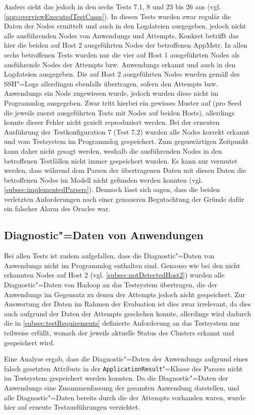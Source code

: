 Anders sieht das jedoch in den sechs \glspl{Test} 7.1, 8 und 23 bis 26 aus (vgl. \cref{app:overviewExecutedTestCases}).
In diesen \glspl{Test} wurden zwar regulär die Daten der Nodes ermittelt und auch in den Logdateien ausgegeben, jedoch nicht alle ausführenden Nodes von \glspl{Anwendung} und Attempts.
Konkret betrifft das hier die beiden auf Host 2 ausgeführten Nodes der betroffenen \gls{AppMstr}.
In allen sechs betroffenen \glspl{Test} wurden nur die vier auf Host 1 ausgeführten Nodes als ausführende Nodes der \glspl{Attempt} bzw. \glspl{Anwendung} erkannt und auch in den Logdateien ausgegeben.
Die auf Host 2 ausgeführten Nodes wurden gemäß des SSH"=Logs allerdingsn ebenfalls übertragen, sofern den \glspl{Attempt} bzw. \glspl{Anwendung} ein Node zugewiesen wurde, jedoch wurden diese nicht im Programmlog ausgegeben.
Zwar tritt hierbei ein gewisses Muster auf (pro Seed die jeweils zuerst ausgeführten \glspl{Test} mit Nodes auf beiden Hosts), allerdings konnte dieser Fehler nicht gezielt reproduziert werden.
Bei der erneuten Ausführung der \gls{Testkonfiguration} 7 (Test 7.2) wurden alle Nodes korrekt erkannt und vom Testsystem im Programmlog gespeichert.
Zum gegenwärtigen Zeitpunkt kann daher nicht gesagt werden, weshalb die ausführenden Nodes in den betroffenen Testfällen nicht immer gespeichert wurden.
Es kann nur vermutet werden, dass während dem Parsen der übertragenen Daten mit diesen Daten die betroffenen Nodes im Modell nicht gefunden werden konnten (vgl. \cref{subsec:implementedParsers}).
Dennoch lässt sich sagen, dass die beiden verletzten Anforderungen nach einer genaueren Begutachtung der Gründe dafür ein falscher Alarm des Oracles war.

\subsection{Diagnostic"=Daten von Anwendungen}
\label{subsec:notSavedAppDiagnostics}

Bei allen \glspl{Test} ist zudem aufgefallen, dass die Diagnostic"=Daten von \glspl{Anwendung} nicht im Programmlog enthalten sind.
Genauso wie bei den nicht erkannten Nodes auf Host 2 (vgl. \cref{subsec:notDetectedHost2}) wurden alle Diagnostic"=Daten von Hadoop an das Testsystem übertragen, die der \glspl{Anwendung} im Gegensatz zu denen der \glspl{Attempt} jedoch nicht gespeichert.
Zur Auswertung der Daten im Rahmen der Evaluation ist dies zwar irrelevant, da dies auch aufgrund der Daten der \glspl{Attempt} geschehen konnte, allerdings wird dadurch die in \cref{subsec:testRequirements} definierte Anforderung an das Testsystem nur teilweise erfüllt, wonach der jeweils aktuelle Status des Clusters erkannt und gespeichert wird.

Eine Analyse ergab, dass die Diagnostic"=Daten der \glspl{Anwendung} aufgrund eines falsch gesetzten Attributs in der \texttt{ApplicationResult}"=Klasse des Parsers nicht im Testsystem gespeichert werden konnten. 
Da die Diagnostic"=Daten der \glspl{Anwendung} eine Zusammenfassung der gesamten \gls{Anwendung} darstellen, und alle Diagnostic"=Daten bereits durch die der \glspl{Attempt} vorhanden waren, wurde hier auf erneute Testausführungen verzichtet.
